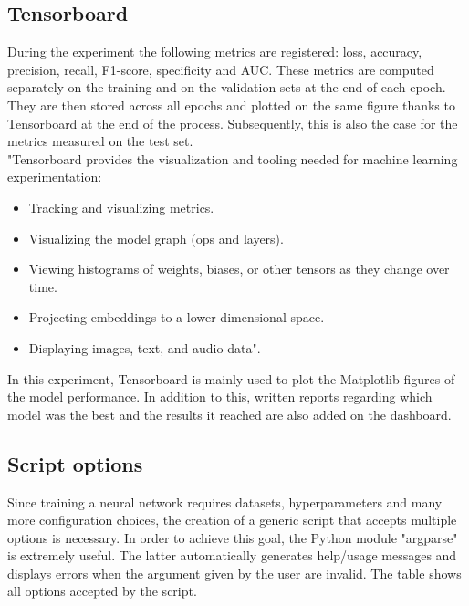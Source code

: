 \subsection{Tensorboard}
During the experiment the following metrics are registered: loss, accuracy, precision, recall, F1-score, specificity and AUC. These metrics are computed separately on the training and on the validation sets at the end of each epoch. They are then stored across all epochs and plotted on the same figure thanks to Tensorboard at the end of the process. Subsequently, this is also the case for the metrics measured on the test set.\\
"Tensorboard provides the visualization and tooling needed for machine learning experimentation:
\begin{itemize}
\item Tracking and visualizing metrics.
\item Visualizing the model graph (ops and layers).
\item Viewing histograms of weights, biases, or other tensors as they change over time.
\item Projecting embeddings to a lower dimensional space.
\item Displaying images, text, and audio data"\cite{39}.
\end{itemize}
In this experiment, Tensorboard is mainly used to plot the Matplotlib figures of the model performance. In addition to this, written reports regarding which model was the best and the results it reached are also added on the dashboard.
\label{paper_tensorboard}
\subsection{Script options}
Since training a neural network requires datasets, hyperparameters and many more configuration choices, the creation of a generic script that accepts multiple options is necessary. In order to achieve this goal, the Python module "argparse" is extremely useful. The latter automatically generates help/usage messages and displays errors when the argument given by the user are invalid. The table shows all options accepted by the script.


